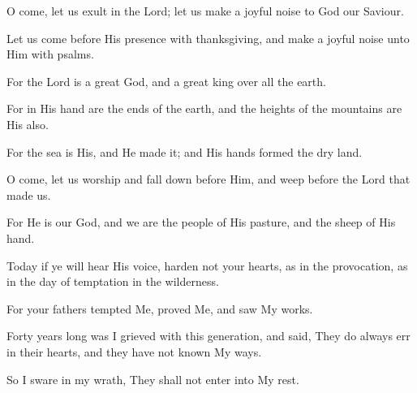 O come, let us exult in the Lord; let us make a joyful noise to God our Saviour.

Let us come before His presence with thanksgiving, and make a joyful noise unto Him with psalms.

For the Lord is a great God, and a great king over all the earth.

For in His hand are the ends of the earth, and the heights of the mountains are His also.

For the sea is His, and He made it; and His hands formed the dry land.

O come, let us worship and fall down before Him, and weep before the Lord that made us.

For He is our God, and we are the people of His pasture, and the sheep of His hand.

Today if ye will hear His voice, harden not your hearts, as in the provocation, as in the day of temptation in the wilderness.

For your fathers tempted Me, proved Me, and saw My works.

Forty years long was I grieved with this generation, and said, They do always err in their hearts, and they have not known My ways.

So I sware in my wrath, They shall not enter into My rest.
